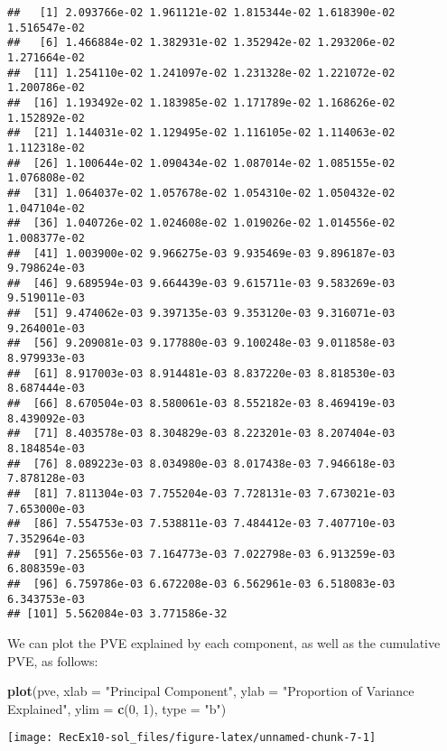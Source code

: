\documentclass[]{article}
\newenvironment{Shaded}{\begin{snugshade}}{\end{snugshade}}
\newcommand{\DataTypeTok}[1]{\textcolor[rgb]{0.13,0.29,0.53}{#1}}
\newcommand{\DecValTok}[1]{\textcolor[rgb]{0.00,0.00,0.81}{#1}}
\newcommand{\KeywordTok}[1]{\textcolor[rgb]{0.13,0.29,0.53}{\textbf{#1}}}
\newcommand{\NormalTok}[1]{#1}
\newcommand{\StringTok}[1]{\textcolor[rgb]{0.31,0.60,0.02}{#1}}
\begin{document}
\begin{verbatim}
##   [1] 2.093766e-02 1.961121e-02 1.815344e-02 1.618390e-02 1.516547e-02
##   [6] 1.466884e-02 1.382931e-02 1.352942e-02 1.293206e-02 1.271664e-02
##  [11] 1.254110e-02 1.241097e-02 1.231328e-02 1.221072e-02 1.200786e-02
##  [16] 1.193492e-02 1.183985e-02 1.171789e-02 1.168626e-02 1.152892e-02
##  [21] 1.144031e-02 1.129495e-02 1.116105e-02 1.114063e-02 1.112318e-02
##  [26] 1.100644e-02 1.090434e-02 1.087014e-02 1.085155e-02 1.076808e-02
##  [31] 1.064037e-02 1.057678e-02 1.054310e-02 1.050432e-02 1.047104e-02
##  [36] 1.040726e-02 1.024608e-02 1.019026e-02 1.014556e-02 1.008377e-02
##  [41] 1.003900e-02 9.966275e-03 9.935469e-03 9.896187e-03 9.798624e-03
##  [46] 9.689594e-03 9.664439e-03 9.615711e-03 9.583269e-03 9.519011e-03
##  [51] 9.474062e-03 9.397135e-03 9.353120e-03 9.316071e-03 9.264001e-03
##  [56] 9.209081e-03 9.177880e-03 9.100248e-03 9.011858e-03 8.979933e-03
##  [61] 8.917003e-03 8.914481e-03 8.837220e-03 8.818530e-03 8.687444e-03
##  [66] 8.670504e-03 8.580061e-03 8.552182e-03 8.469419e-03 8.439092e-03
##  [71] 8.403578e-03 8.304829e-03 8.223201e-03 8.207404e-03 8.184854e-03
##  [76] 8.089223e-03 8.034980e-03 8.017438e-03 7.946618e-03 7.878128e-03
##  [81] 7.811304e-03 7.755204e-03 7.728131e-03 7.673021e-03 7.653000e-03
##  [86] 7.554753e-03 7.538811e-03 7.484412e-03 7.407710e-03 7.352964e-03
##  [91] 7.256556e-03 7.164773e-03 7.022798e-03 6.913259e-03 6.808359e-03
##  [96] 6.759786e-03 6.672208e-03 6.562961e-03 6.518083e-03 6.343753e-03
## [101] 5.562084e-03 3.771586e-32
\end{verbatim}

We can plot the PVE explained by each component, as well as the
cumulative PVE, as follows:

\begin{Shaded}
\begin{Highlighting}[]
\KeywordTok{plot}\NormalTok{(pve, }\DataTypeTok{xlab =} \StringTok{"Principal Component"}\NormalTok{, }\DataTypeTok{ylab =} \StringTok{"Proportion of Variance Explained"}\NormalTok{, }
    \DataTypeTok{ylim =} \KeywordTok{c}\NormalTok{(}\DecValTok{0}\NormalTok{, }\DecValTok{1}\NormalTok{), }\DataTypeTok{type =} \StringTok{"b"}\NormalTok{)}
\end{Highlighting}
\end{Shaded}

\begin{center}\texttt{[image: RecEx10-sol\_files/figure-latex/unnamed-chunk-7-1]} \end{center}
\end{document}
